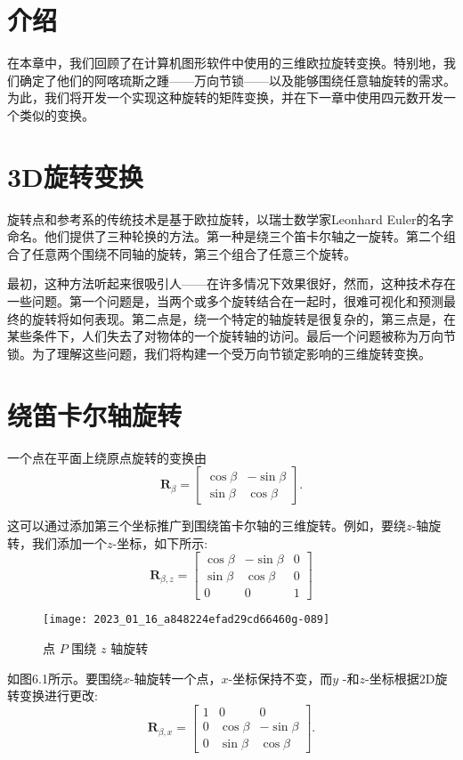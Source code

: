 \section{介绍}
在本章中，我们回顾了在计算机图形软件中使用的三维欧拉旋转变换。特别地，我们确定了他们的阿喀琉斯之踵——万向节锁——以及能够围绕任意轴旋转的需求。为此，我们将开发一个实现这种旋转的矩阵变换，并在下一章中使用四元数开发一个类似的变换。

\section{3D旋转变换}
旋转点和参考系的传统技术是基于欧拉旋转，以瑞士数学家Leonhard Euler的名字命名。他们提供了三种轮换的方法。第一种是绕三个笛卡尔轴之一旋转。第二个组合了任意两个围绕不同轴的旋转，第三个组合了任意三个旋转。

最初，这种方法听起来很吸引人——在许多情况下效果很好，然而，这种技术存在一些问题。第一个问题是，当两个或多个旋转结合在一起时，很难可视化和预测最终的旋转将如何表现。第二点是，绕一个特定的轴旋转是很复杂的，第三点是，在某些条件下，人们失去了对物体的一个旋转轴的访问。最后一个问题被称为万向节锁。为了理解这些问题，我们将构建一个受万向节锁定影响的三维旋转变换。

\section{绕笛卡尔轴旋转}
一个点在平面上绕原点旋转的变换由
$$
\mathbf{R}_{\beta}=\left[\begin{array}{cc}
\cos \beta & -\sin \beta \\
\sin \beta & \cos \beta
\end{array}\right] .
$$

这可以通过添加第三个坐标推广到围绕笛卡尔轴的三维旋转。例如，要绕$z$-轴旋转，我们添加一个$z$-坐标，如下所示:
$$
\mathbf{R}_{\beta, z}=\left[\begin{array}{ccc}
\cos \beta & -\sin \beta & 0 \\
\sin \beta & \cos \beta & 0 \\
0 & 0 & 1
\end{array}\right]
$$

\begin{figure}[h!]
    \centering
    \texttt{[image: 2023\_01\_16\_a848224efad29cd66460g-089]}
    \caption[short]{点 $P$ 围绕 $z$ 轴旋转}
\end{figure}

如图6.1所示。要围绕$x$-轴旋转一个点，$x$-坐标保持不变，而$y$ -和$z$-坐标根据$2 \mathrm{D}$旋转变换进行更改:
$$
\mathbf{R}_{\beta, x}=\left[\begin{array}{ccc}
1 & 0 & 0 \\
0 & \cos \beta & -\sin \beta \\
0 & \sin \beta & \cos \beta
\end{array}\right] .
$$

